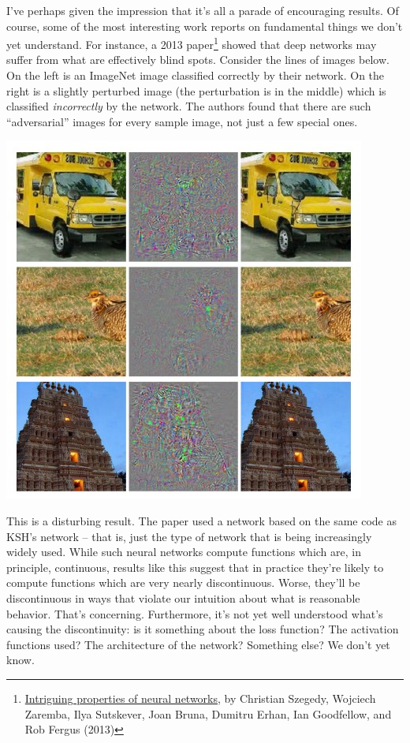 \documentclass[a4paper,twoside,10pt]{book}
\begin{document}
I've perhaps given the impression that it's all a parade of encouraging results. Of course, some of the most interesting work reports on fundamental things we don't yet understand. For instance, a 2013 paper\footnote{\href{http://arxiv.org/abs/1312.6199}{Intriguing properties of neural networks}, by Christian Szegedy, Wojciech Zaremba, Ilya Sutskever, Joan Bruna, Dumitru Erhan, Ian Goodfellow, and Rob Fergus (2013)} showed that deep networks may suffer from what are effectively blind spots. Consider the lines of images below. On the left is an ImageNet image classified correctly by their network. On the right is a slightly perturbed image (the perturbation is in the middle) which is classified \textit{incorrectly} by the network. The authors found that there are such ``adversarial'' images for every sample image, not just a few special ones.
\begin{center}
	\includegraphics[width=0.55\linewidth]{figures/ch6/adversarial}
\end{center}
This is a disturbing result. The paper used a network based on the same code as KSH's network -- that is, just the type of network that is being increasingly widely used. While such neural networks compute functions which are, in principle, continuous, results like this suggest that in practice they're likely to compute functions which are very nearly discontinuous. Worse, they'll be discontinuous in ways that violate our intuition about what is reasonable behavior. That's concerning. Furthermore, it's not yet well understood what's causing the discontinuity: is it something about the loss function? The activation functions used? The architecture of the network? Something else? We don't yet know.
\end{document}

